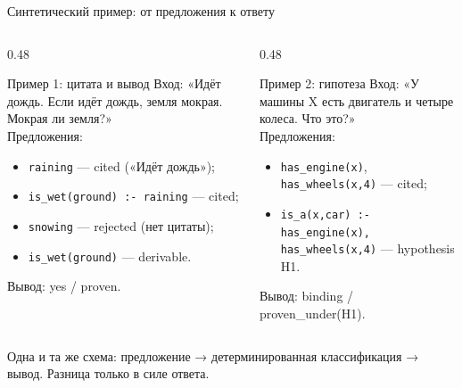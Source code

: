 \documentclass[aspectratio=169,11pt]{beamer}
\newcommand{\Logos}[1]{\textcolor{logoscolor}{#1}}
\newcommand{\Hyp}[1]{\textcolor{hypocolor}{#1}}
\newcommand{\Rej}[1]{\textcolor{rejectcolor}{#1}}
\newcommand{\Prov}[1]{\textcolor{provencolor}{#1}}
\begin{document}
\begin{frame}[shrink=4]{Синтетический пример: от предложения к ответу}
  \footnotesize
  \begin{columns}[T,onlytextwidth]
    \begin{column}{0.48\textwidth}
      \begin{block}{Пример 1: цитата и вывод}
        Вход: «Идёт дождь. Если идёт дождь, земля мокрая.
        Мокрая ли земля?»\\[1mm]
        Предложения:
        \begin{itemize}
          \item \texttt{raining} --- \Logos{cited} («Идёт дождь»);
          \item \texttt{is\_wet(ground) :- raining} --- \Logos{cited};
          \item \texttt{snowing} --- \Rej{rejected} (нет цитаты);
          \item \texttt{is\_wet(ground)} --- \Prov{derivable}.
        \end{itemize}
        Вывод: \Prov{yes / proven}.
      \end{block}
    \end{column}
    \begin{column}{0.48\textwidth}
      \begin{block}{Пример 2: гипотеза}
        Вход: «У машины X есть двигатель и четыре колеса.
        Что это?»\\[1mm]
        Предложения:
        \begin{itemize}
          \item \texttt{has\_engine(x)}, \texttt{has\_wheels(x,4)}
                --- \Logos{cited};
          \item \texttt{is\_a(x,car) :- has\_engine(x),
                has\_wheels(x,4)} --- \Hyp{hypothesis H1}.
        \end{itemize}
        Вывод: \Hyp{binding / proven\_under(H1)}.
      \end{block}
    \end{column}
  \end{columns}

  \vspace{2mm}
  {\footnotesize Одна и та же схема: предложение → детерминированная
  классификация → вывод. Разница только в силе ответа.}
\end{frame}
\end{document}
